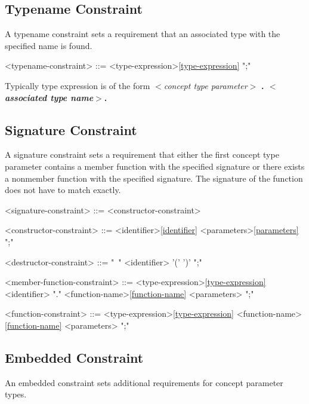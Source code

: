 \documentclass[a4paper,oneside,11pt]{article}
\begin{document}
\subsection{Typename Constraint}

A typename constraint sets a requirement that an associated type with the specified name is found.

\begin{grammar}
\label{typename-constraint}<typename-constraint> ::=  <type-expression>\ref{type-expression} ";"
\end{grammar}

Typically type expression is of the form \emph{$<$concept type parameter$>$} \bf{.} \emph{$<$associated type name$>$}.

\subsection{Signature Constraint}

A signature constraint sets a requirement that either the first concept type parameter contains a member function with the specified signature or there exists a nonmember function with the specified signature.
The signature of the function does not have to match exactly.

\begin{grammar}
\label{signature-constraint}<signature-constraint> ::= <constructor-constraint>

<constructor-constraint> ::= <identifier>\ref{identifier} <parameters>\ref{parameters} ";"

<destructor-constraint> ::= "~" <identifier> '(' ')' ";"

<member-function-constraint> ::= <type-expression>\ref{type-expression}\\
<identifier> "." <function-name>\ref{function-name} <parameters> ";"

<function-constraint> ::= <type-expression>\ref{type-expression} <function-name>\ref{function-name} <parameters> ";"
\end{grammar}

\subsection{Embedded Constraint}

An embedded constraint sets additional requirements for concept parameter types.
\end{document}

